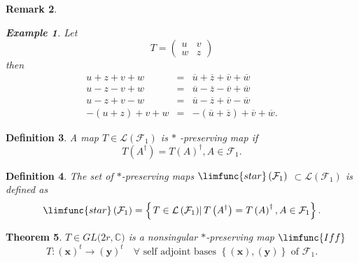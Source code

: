 \documentclass[aps,preprint]{revtex4}
\newtheorem{theorem}{Theorem}
\newtheorem{definition}[theorem]{Definition}
\newtheorem{example}[theorem]{Example}
\newtheorem{remark}[theorem]{Remark}
\begin{document}
\begin{remark}
\begin{enumerate}
\begin{example}
Let 
\begin{equation}
T=\left( 
\begin{array}{cc}
u & v \\ 
w & z%
\end{array}%
\right)
\end{equation}%
then 
\begin{eqnarray}
u+z+v+w &=&\overline{u}+\overline{z}+\overline{v}+\overline{w} \\
u-z-v+w &=&\overline{u}-\overline{z}-\overline{v}+\overline{w} \\
u-z+v-w &=&\overline{u}-\overline{z}+\overline{v}-\overline{w} \\
-\left( u+z\right) +v+w &=&-\left( \overline{u}+\overline{z}\right) +%
\overline{v}+\overline{w}.
\end{eqnarray}
\end{example}
\end{enumerate}
\end{remark}

\begin{definition}
A map $T\in \mathcal{L}\left( \mathcal{F}_{1}\right) $ is $\ast $\emph{%
-preserving map} if 
\begin{equation}
T\left( A^{\dagger }\right) =T\left( A\right) ^{\dagger },A\in \mathcal{F}%
_{1}.
\end{equation}
\end{definition}

\begin{definition}
The set of $\ast $-preserving maps $\limfunc{star}\left( \mathcal{F}%
_{1}\right) $ $\subset \mathcal{L}\left( \mathcal{F}_{1}\right) $ is defined
as 
\begin{equation}
\limfunc{star}\left( \mathcal{F}_{1}\right) =\left\{ \left. T\in \mathcal{L}%
\left( \mathcal{F}_{1}\right) \right\vert T\left( A^{\dagger }\right)
=T\left( A\right) ^{\dagger },A\in \mathcal{F}_{1}\right\} .
\end{equation}
\end{definition}

\begin{theorem}
$T\in GL(2r,\mathbb{C)}$ is a nonsingular $\ast $-preserving map $\limfunc{%
Iff}$ 
\begin{equation}
T:\left( \boldsymbol{x}\right) ^{t}\rightarrow \left( \boldsymbol{y}\right)
^{t}\quad \forall \text{ self adjoint bases }\left\{ \left( \boldsymbol{x}%
\right) ,\left( \boldsymbol{y}\right) \right\} \text{ of }\mathcal{F}_{1}.
\end{equation}
\end{theorem}
\end{document}
